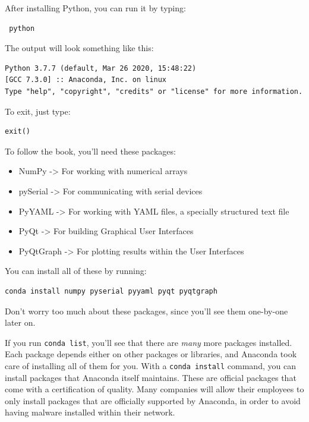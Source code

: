 After installing Python, you can run it by typing:

\begin{verbatim}
 python
\end{verbatim}

The output will look something like this:

\begin{verbatim}
Python 3.7.7 (default, Mar 26 2020, 15:48:22)
[GCC 7.3.0] :: Anaconda, Inc. on linux
Type "help", "copyright", "credits" or "license" for more information.
\end{verbatim}

To exit, just type:

\begin{verbatim}
exit()
\end{verbatim}

To follow the book, you'll need these packages:

\begin{itemize}
 \item NumPy -> For working with numerical arrays
 \item pySerial -> For communicating with serial devices
 \item PyYAML -> For working with YAML files, a specially structured text file
 \item PyQt -> For building Graphical User Interfaces
 \item PyQtGraph -> For plotting results within the User Interfaces
\end{itemize}

You can install all of these by running:

\begin{verbatim}
conda install numpy pyserial pyyaml pyqt pyqtgraph
\end{verbatim}

Don't worry too much about these packages, since you'll see them one-by-one later on.

If you run \texttt{conda list}, you'll see that there are \emph{many} more packages installed. Each package depends either on other packages or libraries, and Anaconda took care of installing all of them for you. With a \texttt{conda install} command, you can install packages that Anaconda itself maintains. These are official packages that come with a certification of quality. Many companies will allow their employees to only install packages that are officially supported by Anaconda, in order to avoid having malware installed within their network.

